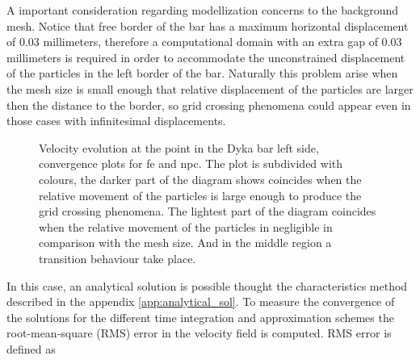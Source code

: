 \documentclass[preprint,12pt,a4paper]{elsarticle}
\begin{document}
A important consideration regarding modellization concerns to the
background mesh. Notice that free border of the bar has a maximum
horizontal displacement of 0.03 millimeters, therefore 
a computational domain with an extra gap of 0.03 millimeters is
required in order to accommodate the unconstrained displacement of the
particles in the left border of the bar. Naturally this problem arise
when the mesh size is small enough that relative displacement of the
particles are larger then the distance to the border, so grid crossing
phenomena could appear even in those cases with infinitesimal
displacements.
\begin{figure}\sidecaption
  \centering
  \caption{Velocity evolution at the point in the Dyka bar left side,
    convergence plots for \acrshort{fe} and \acrshort{npc}. The plot is subdivided with
    colours, the darker part of the diagram shows coincides when the
    relative movement of the particles is large enough to produce the
    grid crossing phenomena. The lightest part of the diagram
    coincides when the relative movement of the particles in
    negligible in comparison with the mesh size. And in the middle
    region a transition behaviour take place.}
  \label{fig:Dyka-error-evol}
\end{figure}
In this case, an analytical solution is possible
thought the characteristics method described in the appendix
\ref{app:analytical_sol}. To measure the convergence of the solutions
for the different time integration and approximation schemes the
root-mean-square (RMS) error in the velocity field is computed. RMS
error is defined as
\end{document}
